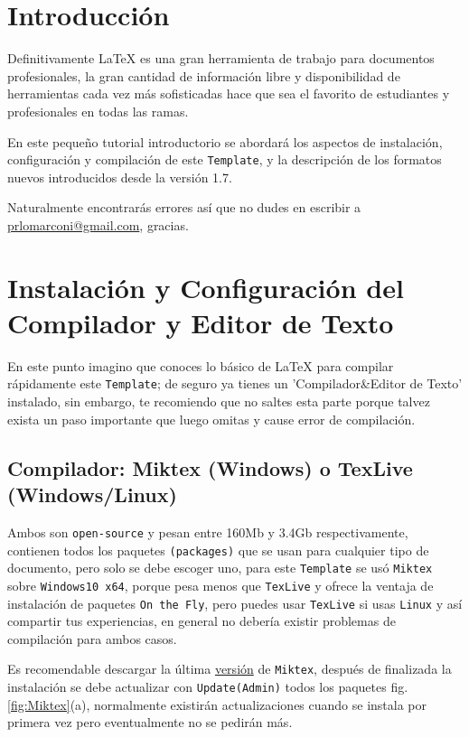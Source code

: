 \section{Introducción}
Definitivamente {\LaTeX} es una gran herramienta de trabajo para documentos profesionales, la gran cantidad de información libre y disponibilidad de herramientas cada vez más sofisticadas hace que sea el favorito de estudiantes y profesionales en todas las ramas.

En este pequeño tutorial introductorio se abordará los aspectos de instalación, configuración y compilación de este \verb|Template|, y la descripción de los formatos nuevos introducidos desde la versión 1.7. 

Naturalmente encontrarás errores así que no dudes en escribir a \url{prlomarconi@gmail.com}, gracias.

\section{Instalación y Configuración del Compilador y Editor de Texto}
En este punto imagino que conoces lo básico de {\LaTeX} para compilar rápidamente este \verb|Template|; de seguro ya tienes un 'Compilador\&Editor de Texto' instalado, sin embargo, te recomiendo que no saltes esta parte porque talvez exista un paso importante que luego omitas y cause error de compilación.

\subsection{Compilador: Miktex (Windows) o TexLive (Windows/Linux)}
Ambos son \verb|open-source| y pesan entre 160Mb y 3.4Gb respectivamente, contienen todos los paquetes \verb|(packages)| que se usan para cualquier tipo de documento, pero solo se debe escoger uno, para este \verb|Template| se usó \verb|Miktex| sobre \verb|Windows10 x64|, porque pesa menos que \verb|TexLive| y ofrece la ventaja de instalación de paquetes \verb|On the Fly|, pero puedes usar \verb|TexLive| si usas \verb|Linux| y así compartir tus experiencias, en general no debería existir problemas de compilación para ambos casos.

Es recomendable descargar la última \href{http://miktex.org/download}{versión} de \verb|Miktex|, después de finalizada la instalación se debe actualizar con \verb|Update(Admin)| todos los paquetes fig. \ref{fig:Miktex}(a), normalmente existirán actualizaciones cuando se instala por primera vez pero eventualmente no se pedirán más.

